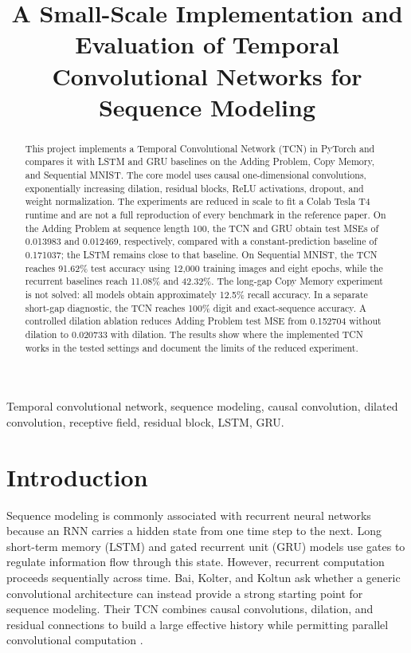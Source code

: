 \documentclass[conference]{IEEEtran}
\title{A Small-Scale Implementation and Evaluation of Temporal Convolutional Networks for Sequence Modeling}
\author{\IEEEauthorblockN{Pankaj Yadav}
\IEEEauthorblockA{Department of Computer Science and Engineering\\
Rajiv Gandhi Institute of Petroleum Technology, Jais, India\\
Roll No.: 24CS3035}}
\begin{document}
\maketitle

\begin{abstract}
This project implements a Temporal Convolutional Network (TCN) in PyTorch and compares it with LSTM and GRU baselines on the Adding Problem, Copy Memory, and Sequential MNIST. The core model uses causal one-dimensional convolutions, exponentially increasing dilation, residual blocks, ReLU activations, dropout, and weight normalization. The experiments are reduced in scale to fit a Colab Tesla T4 runtime and are not a full reproduction of every benchmark in the reference paper. On the Adding Problem at sequence length 100, the TCN and GRU obtain test MSEs of 0.013983 and 0.012469, respectively, compared with a constant-prediction baseline of 0.171037; the LSTM remains close to that baseline. On Sequential MNIST, the TCN reaches 91.62\% test accuracy using 12,000 training images and eight epochs, while the recurrent baselines reach 11.08\% and 42.32\%. The long-gap Copy Memory experiment is not solved: all models obtain approximately 12.5\% recall accuracy. In a separate short-gap diagnostic, the TCN reaches 100\% digit and exact-sequence accuracy. A controlled dilation ablation reduces Adding Problem test MSE from 0.152704 without dilation to 0.020733 with dilation. The results show where the implemented TCN works in the tested settings and document the limits of the reduced experiment.
\end{abstract}

\begin{IEEEkeywords}
Temporal convolutional network, sequence modeling, causal convolution, dilated convolution, receptive field, residual block, LSTM, GRU.
\end{IEEEkeywords}

\section{Introduction}
Sequence modeling is commonly associated with recurrent neural networks because an RNN carries a hidden state from one time step to the next. Long short-term memory (LSTM) and gated recurrent unit (GRU) models use gates to regulate information flow through this state. However, recurrent computation proceeds sequentially across time. Bai, Kolter, and Koltun ask whether a generic convolutional architecture can instead provide a strong starting point for sequence modeling. Their TCN combines causal convolutions, dilation, and residual connections to build a large effective history while permitting parallel convolutional computation \cite{bai2018}.
\end{document}
